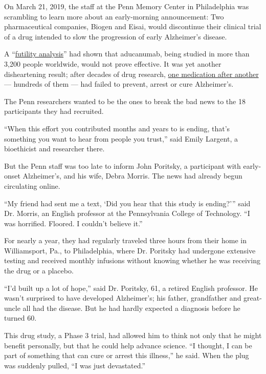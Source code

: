 On March 21, 2019, the staff at the Penn Memory Center in Philadelphia
was scrambling to learn more about an early-morning announcement: Two
pharmaceutical companies, Biogen and Eisai, would discontinue their
clinical trial of a drug intended to slow the progression of early
Alzheimer's disease.

A
``\href{http://investors.biogen.com/news-releases/news-release-details/biogen-and-eisai-discontinue-phase-3-engage-and-emerge-trials}{futility
analysis}'' had shown that aducanumab, being studied in more than 3,200
people worldwide, would not prove effective. It was yet another
disheartening result; after decades of drug research,
\href{https://www.nytimes3xbfgragh.onion/2020/02/10/health/alzheimers-amyloid-drug.html}{one
medication after another} --- hundreds of them --- had failed to
prevent, arrest or cure Alzheimer's.

The Penn researchers wanted to be the ones to break the bad news to the
18 participants they had recruited.

``When this effort you contributed months and years to is ending, that's
something you want to hear from people you trust,'' said Emily Largent,
a bioethicist and researcher there.

But the Penn staff was too late to inform John Poritsky, a participant
with early-onset Alzheimer's, and his wife, Debra Morris. The news had
already begun circulating online.

``My friend had sent me a text, `Did you hear that this study is
ending?''' said Dr. Morris, an English professor at the Pennsylvania
College of Technology. ``I was horrified. Floored. I couldn't believe
it.''

For nearly a year, they had regularly traveled three hours from their
home in Williamsport, Pa., to Philadelphia, where Dr. Poritsky had
undergone extensive testing and received monthly infusions without
knowing whether he was receiving the drug or a placebo.

``I'd built up a lot of hope,'' said Dr. Poritsky, 61, a retired English
professor. He wasn't surprised to have developed Alzheimer's; his
father, grandfather and great-uncle all had the disease. But he had
hardly expected a diagnosis before he turned 60.

This drug study, a Phase 3 trial, had allowed him to think not only that
he might benefit personally, but that he could help advance science. ``I
thought, I can be part of something that can cure or arrest this
illness,'' he said. When the plug was suddenly pulled, ``I was just
devastated.''

